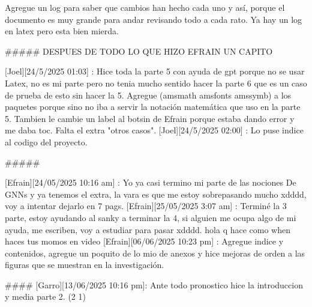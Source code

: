 Agregue un log para saber que cambios han hecho cada uno y así, porque el documento es muy grande para andar revisando todo a cada rato. Ya hay un log en latex pero esta bien mierda.

#####
DESPUES DE TODO LO QUE HIZO EFRAIN UN CAPITO

[Joel][24/5/2025 01:03] : Hice toda la parte 5 con ayuda de gpt porque no se usar Latex, no es mi parte pero no tenia mucho sentido hacer la parte 6 que es un caso de prueba de esto sin hacer la 5. Agregue ({amsmath} {amsfonts} {amssymb}) a los paquetes porque sino no iba a servir la notación matemática que uso en la parte 5. Tambien le cambie un label al botsin de Efrain porque estaba dando error y me daba toc. Falta el extra "otros casos".
[Joel][24/5/2025 02:00] : Lo puse indice al codigo del proyecto.

#####

[Efrain][24/05/2025 10:16 am] : Yo ya casi termino mi parte de las nociones De GNNs y ya tenemos el extra, la vara es que me estoy sobrepasando mucho xdddd, voy a intentar dejarlo en 7 pags.
[Efrain][25/05/2025 3:07 am] : Terminé la 3 parte, estoy ayudando al sanky a terminar la 4, si alguien me ocupa algo de mi ayuda, me escriben, voy a estudiar para pasar xdddd.
hola q hace
como when haces tus momos en video
[Efrain][06/06/2025 10:23 pm] : Agregue indice y contenidos, agregue un poquito de lo mio de anexos y hice mejoras de orden a las figuras que se muestran en la investigación.

####
[Garro][13/06/2025 10:16 pm]: Ante todo pronostico hice la introduccion y media parte 2. (2 1)